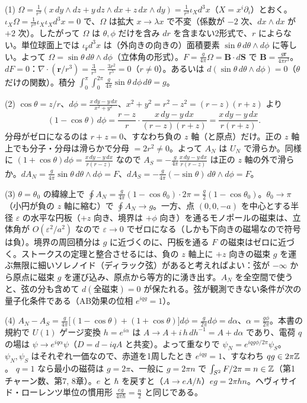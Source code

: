 \begin{solution}
(1) $\Omega=\frac{1}{r^3}(x\,dy\wedge dz+y\,dz\wedge dx+z\,dx\wedge dy)=\frac1{r^3}\iota_X d^3x$（$X=x^i\partial_i$）とおく。$\iota_X\Omega=\frac1{r^3}\iota_X\iota_Xd^3x=0$ で、$\Omega$ は拡大 $x\to\lambda x$ で不変（係数が $-2$ 次、$dx\wedge dx$ が $+2$ 次）。したがって $\Omega$ は $\theta,\phi$ だけを含み $dr$ を含まない2形式で、$r$ によらない。単位球面上では $\iota_{\hat{\bm r}}d^3x$ は（外向きの向きの）面積要素 $\sin\theta\,d\theta\wedge d\phi$ に等しい。よって $\Omega=\sin\theta\,d\theta\wedge d\phi$（立体角の形式）。$F=\frac{g}{4\pi}\Omega=\bm B\cdot d\bm S$ で $\bm B=\frac{g\bm r}{4\pi r^3}$。
$dF=0$：$\nabla\cdot(\bm r/r^3)=\frac{3}{r^3}-\frac{3r^2}{r^5}=0$（$r\neq0$）。あるいは $d(\sin\theta\,d\theta\wedge d\phi)=0$（$\theta$ だけの関数）。積分 $\int_0^\pi\!\int_0^{2\pi}\frac{g}{4\pi}\sin\theta\,d\phi\,d\theta=g$。

(2) $\cos\theta=z/r$、$d\phi=\frac{x\,dy-y\,dx}{x^2+y^2}$、$x^2+y^2=r^2-z^2=(r-z)(r+z)$ より
\[
(1-\cos\theta)\,d\phi=\frac{r-z}{r}\cdot\frac{x\,dy-y\,dx}{(r-z)(r+z)}=\frac{x\,dy-y\,dx}{r(r+z)} .
\]
分母がゼロになるのは $r+z=0$、すなわち負の $z$ 軸（と原点）だけ。正の $z$ 軸上でも分子・分母は滑らかで分母 $=2r^2\neq0$。よって $A_N$ は $U_N$ で滑らか。同様に $(1+\cos\theta)d\phi=\frac{x\,dy-y\,dx}{r(r-z)}$ なので $A_S=-\frac{g}{4\pi}\frac{x\,dy-y\,dx}{r(r-z)}$ は正の $z$ 軸の外で滑らか。$dA_N=\frac{g}{4\pi}\sin\theta\,d\theta\wedge d\phi=F$、$dA_S=-\frac{g}{4\pi}(-\sin\theta)\,d\theta\wedge d\phi=F$。

(3) $\theta=\theta_0$ の緯線上で $\oint A_N=\frac{g}{4\pi}(1-\cos\theta_0)\cdot2\pi=\frac g2(1-\cos\theta_0)$。$\theta_0\to\pi$（小円が負の $z$ 軸に縮む）で $\oint A_N\to g$。一方、点 $(0,0,-a)$ を中心とする半径 $\varepsilon$ の水平な円板（$+z$ 向き、境界は $+\phi$ 向き）を通るモノポールの磁束は、立体角が $O(\varepsilon^2/a^2)$ なので $\varepsilon\to0$ でゼロになる（しかも下向きの磁場なので符号は負）。境界の周回積分は $g$ に近づくのに、円板を通る $F$ の磁束はゼロに近づく。ストークスの定理と整合させるには、負の $z$ 軸上に $+z$ 向きの磁束 $g$ を運ぶ無限に細いソレノイド（ディラック弦）があると考えればよい：弦が $-\infty$ から原点に磁束 $g$ を運び込み、原点から等方的に湧き出す。$A_N$ を全空間で使うと、弦の分も含めて $d(\text{全磁束})=0$ が保たれる。弦が観測できない条件が次の量子化条件である（AB効果の位相 $e^{iqg}=1$）。

(4) $A_N-A_S=\frac{g}{4\pi}\bigl[(1-\cos\theta)+(1+\cos\theta)\bigr]d\phi=\frac{g}{2\pi}d\phi=d\alpha$、$\alpha=\frac{g\phi}{2\pi}$。本書の規約で $U(1)$ ゲージ変換 $h=e^{i\alpha}$ は $A\to A+i\,h\,dh^{-1}=A+d\alpha$ であり、電荷 $q$ の場は $\psi\to e^{iq\alpha}\psi$（$D=d-iqA$ と共変）。よって重なりで $\psi_N=e^{iqg\phi/2\pi}\psi_S$。$\psi_N,\psi_S$ はそれぞれ一価なので、赤道を1周したとき $e^{iqg}=1$、すなわち $qg\in2\pi\mathbb{Z}$。
$q=1$ なら最小の磁荷は $g=2\pi$、一般に $g=2\pi n$ で $\int_{S^2}F/2\pi=n\in\mathbb{Z}$（第1チャーン数、第7, 8章）。$e$ と $\hbar$ を戻すと（$A\to eA/\hbar$）$eg=2\pi\hbar n$。ヘヴィサイド・ローレンツ単位の慣用形 $\frac{eg}{4\pi\hbar}=\frac n2$ と同じである。
\end{solution}

